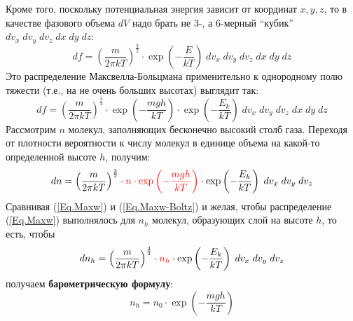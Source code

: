 Кроме того, поскольку потенциальная энергия зависит от координат $x,y,z$, то в качестве фазового объема $dV$ надо брать не 3-, а 6-мерный ``кубик'' $dv_x\;dv_y\;dv_z\;dx\;dy\;dz$:
\begin{equation}
df= \left(\frac{m}{2\pi kT}\right)^\frac32 \cdot \exp\left(-\frac{E}{kT}\right)\;dv_x\;dv_y\;dv_z\;dx\;dy\;dz
\end{equation}
Это распределение Максвелла-Больцмана применительно к однородному полю тяжести (т.е., на не очень больших высотах) выглядит так:
\begin{displaymath}
df= \left(\frac{m}{2\pi kT}\right)^\frac32 \cdot \exp\left(-\frac{mgh}{kT}\right)\cdot \exp\left(-\frac{E_k}{kT}\right)\;dv_x\;dv_y\;dv_z\;dx\;dy\;dz
\end{displaymath}
Рассмотрим $n$ молекул, заполняющих бесконечно высокий столб газа.
Переходя от плотности вероятности к числу молекул в единице объема на какой-то определенной высоте $h$, получим:
\begin{equation}\label{Eq.Maxw-Boltz}
dn= \left(\frac{m}{2\pi kT}\right)^\frac32\cdot {\color{red} n \cdot \exp\left(-\frac{mgh}{kT}\right)}\cdot \exp\left(-\frac{E_k}{kT}\right)\;dv_x\;dv_y\;dv_z
\end{equation}
Сравнивая (\ref{Eq.Maxw}) и (\ref{Eq.Maxw-Boltz}) и желая, чтобы распределение (\ref{Eq.Maxw}) выполнялось для $n_h$ молекул, образующих слой на высоте $h$, то есть, чтобы
\begin{displaymath}
dn_h= \left(\frac{m}{2\pi kT}\right)^\frac32\cdot {\color{red} n_h} \cdot \exp\left(-\frac{E_k}{kT}\right)\;dv_x\;dv_y\;dv_z
\end{displaymath}
получаем {\bf \color{red} барометрическую формулу}:
\begin{equation}
n_h=n_0\cdot\exp\left(-\frac{mgh}{kT}\right)
\end{equation}

